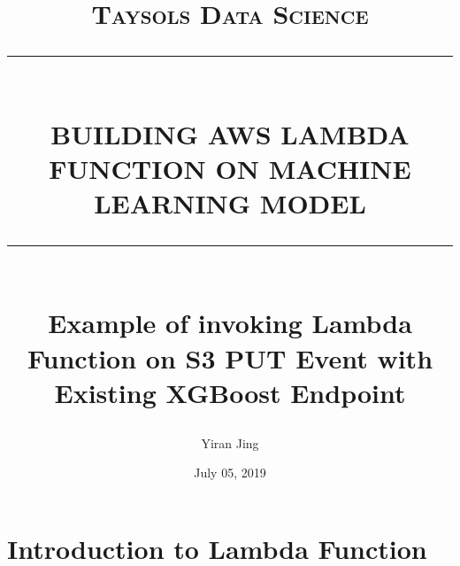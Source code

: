 \documentclass[12pt]{article}
\newcommand{\HRule}[1]{\rule{\linewidth}{#1}}
\begin{document}
\title{ \normalsize \textsc{Taysols Data Science}
		\\ [2.0cm]
		\HRule{0.5pt} \\
		\LARGE \textbf{\uppercase{Building AWS Lambda Function on Machine Learning model}}
		\HRule{2pt} \\ [0.5cm]
		\small \textbf{Example of invoking Lambda Function on S3 PUT Event with Existing XGBoost Endpoint}
		\normalsize \vspace*{5\baselineskip}}
		
\date{July 05, 2019}
\author{Yiran Jing\\}
\maketitle

\newpage
\thispagestyle{empty}

\newpage
\tableofcontents
\newpage
\setcounter{page}{1}




\section{Introduction to Lambda Function}
\end{document}
